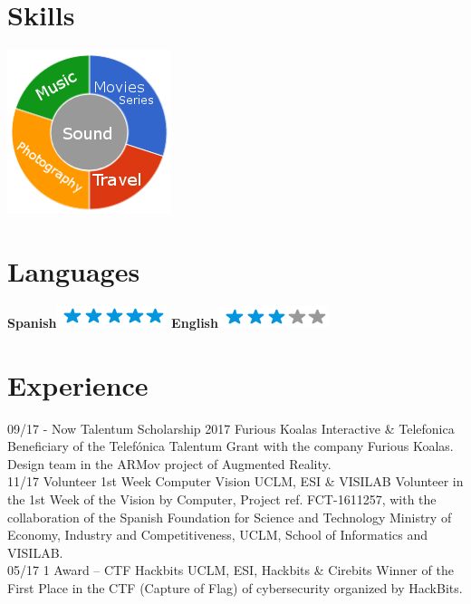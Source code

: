 \documentclass[]{friggeri-cv}
\begin{document}
\begin{aside}
  \section{Skills}
    \includegraphics[scale=0.62]{img/personal.png}
    ~
    \section{Languages}
    \textbf{Spanish}\includegraphics[scale=0.40]{img/5stars.png}
    \textbf{English}\includegraphics[scale=0.40]{img/3stars.png}
    ~
\end{aside}

\section{Experience}
\begin{entrylist}
  \entry
    {09/17 - Now}
    {Talentum Scholarship 2017}
    {Furious Koalas Interactive \& Telefonica}
    {Beneficiary of the Telefónica Talentum Grant with the company Furious Koalas. Design team in the ARMov project of Augmented Reality.\\}
  \entry
    {11/17}
    {Volunteer 1st Week Computer Vision}
    {UCLM, ESI \& VISILAB}
    {Volunteer in the 1st Week of the Vision by Computer, Project ref. FCT-1611257, with the collaboration of the Spanish Foundation for Science and Technology Ministry of Economy, Industry and Competitiveness, UCLM, School of Informatics and VISILAB.\\}
    \entry
    {05/17}
    {1 Award – CTF Hackbits}
    {UCLM, ESI, Hackbits \& Cirebits}
    {Winner of the First Place in the CTF (Capture of Flag) of cybersecurity organized by HackBits.\\}
\end{entrylist}
\end{document}

